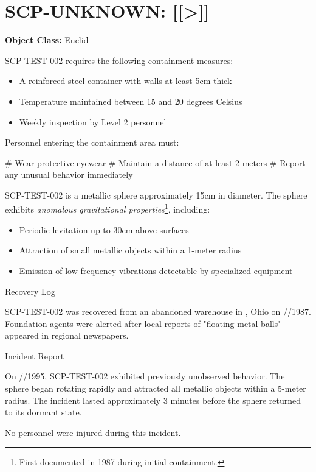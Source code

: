 \section{SCP-UNKNOWN: [[\textgreater{}]]}

\textbf{Object Class:} Euclid

\containment

SCP-TEST-002 requires the following containment measures:

\begin{itemize}
\item A reinforced steel container with walls at least 5cm thick
\item Temperature maintained between 15 and 20 degrees Celsius
\item Weekly inspection by Level 2 personnel
\end{itemize}

Personnel entering the containment area must:

\# Wear protective eyewear
\# Maintain a distance of at least 2 meters
\# Report any unusual behavior immediately

\scpdescription

SCP-TEST-002 is a metallic sphere approximately 15cm in diameter. The sphere exhibits \textit{anomalous gravitational properties}\footnote{First documented in 1987 during initial containment.}, including:

\begin{itemize}
\item Periodic levitation up to 30cm above surfaces
\item Attraction of small metallic objects within a 1-meter radius
\item Emission of low-frequency vibrations detectable by specialized equipment
\end{itemize}


Recovery Log

SCP-TEST-002 was recovered from an abandoned warehouse in \blackbox{}\blackbox{}\blackbox{}\blackbox{}\blackbox{}\blackbox{}\blackbox{}\blackbox{}, Ohio on \blackbox{}\blackbox{}/\blackbox{}\blackbox{}/1987. Foundation agents were alerted after local reports of "floating metal balls" appeared in regional newspapers.


Incident Report

On \blackbox{}\blackbox{}/\blackbox{}\blackbox{}/1995, SCP-TEST-002 exhibited previously unobserved behavior. The sphere began rotating rapidly and attracted all metallic objects within a 5-meter radius. The incident lasted approximately 3 minutes before the sphere returned to its dormant state.

No personnel were injured during this incident.

